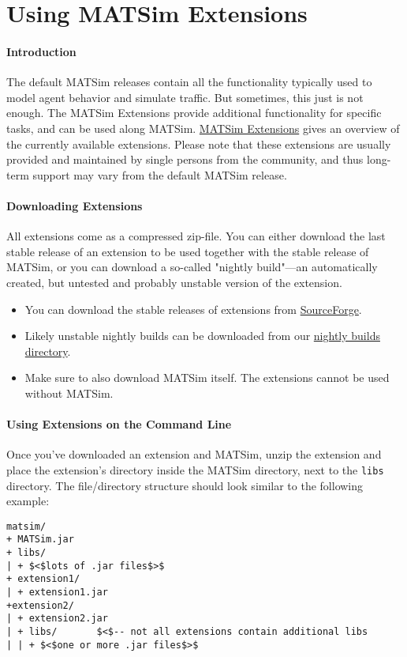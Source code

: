 \chapter{Using MATSim Extensions}

\subsubsection{Introduction}

The default MATSim releases contain all the functionality typically  used to model agent behavior and simulate traffic. But sometimes, this  just is not enough. The MATSim Extensions provide additional  functionality for specific tasks, and can be used along MATSim. \href{http://www.matsim.org/extensions}{MATSim Extensions}  gives an overview of the currently available extensions. Please note  that these extensions are usually provided and maintained by single  persons from the community, and thus long-term support may vary from the  default MATSim release.

\subsubsection{Downloading Extensions}

All extensions come as a compressed zip-file. You can either download  the last stable release of an extension to be used together with the  stable release of MATSim, or you can download a so-called "nightly  build"—an automatically created, but untested and probably unstable  version of the extension.
\begin{itemize}
	\item You can download the stable releases of extensions from \href{http://sourceforge.net/projects/matsim/files/MATSim/}{SourceForge}.
	\item Likely unstable nightly builds can be downloaded from our \href{http://matsim.org/files/builds/}{nightly builds directory}.
	\item Make sure to also download MATSim itself. The extensions cannot be used without MATSim.
\end{itemize}

\subsubsection{Using Extensions on the Command Line}

Once you've downloaded an extension and MATSim, unzip the extension  and place the extension's directory inside the MATSim directory, next to  the 
\texttt{libs} directory. The file/directory structure should look similar to the following example:
\begin{verbatim}
matsim/
+ MATSim.jar
+ libs/
| + $<$lots of .jar files$>$
+ extension1/
| + extension1.jar
+extension2/
| + extension2.jar
| + libs/       $<$-- not all extensions contain additional libs
| | + $<$one or more .jar files$>$
\end{verbatim}

